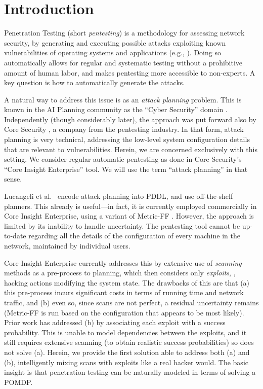 \section{Introduction}
\label{introduction}


Penetration Testing (short {\em pentesting}) is a methodology for
assessing network security, by generating and executing possible
attacks exploiting known vulnerabilities of operating systems and
applications (e.g., \cite{ArcGra04}). Doing so automatically allows
for regular and systematic testing without a prohibitive amount of
human labor, and makes pentesting more accessible to non-experts. A
key question is how to automatically generate the attacks.


A natural way to address this issue is as an {\em attack planning}
problem. This is known in the AI Planning community as the ``Cyber
Security'' domain \cite{BodGohHaiHar05}. Independently (though
considerably later), the approach was put forward also by Core
Security \cite{LucSarRic10}, a company from the
pentesting industry. In that form, attack planning is very technical,
addressing the low-level system configuration details that are
relevant to vulnerabilities. %
Herein, we are concerned exclusively with this setting. We consider
regular automatic pentesting as done in Core Security's ``Core Insight
Enterprise'' tool. We will use the term ``attack planning'' in that
sense.

Lucangeli et al.\  encode attack planning into
PDDL, and use off-the-shelf planners. This already is useful---in
fact, it is currently employed commercially in Core Insight
Enterprise, using a variant of Metric-FF
\cite{hoffmann:jair-03}. However, the approach is limited by its
inability to handle uncertainty. The pentesting tool cannot be
up-to-date regarding all the details of the configuration of every
machine in the network, maintained by individual users.

Core Insight Enterprise currently addresses this by extensive use of
{\em scanning} methods as a pre-process to planning, which then
considers only {\em exploits}, \ie, hacking actions modifying the
system state. The drawbacks of this are that (a) this pre-process
incurs significant costs in terms of running time and network traffic,
and (b) even so, since scans are not perfect, a residual uncertainty
remains (Metric-FF is run based on the configuration that appears to
be most likely). Prior work \cite{SarRicLuc11} has addressed (b) by
associating each exploit with a success probability. This is unable to
model dependencies between the exploits, %
and it still requires extensive scanning (to obtain realistic success
probabilities) so does not solve (a). Herein, we provide the first
solution able to address both (a) and (b), intelligently mixing scans
with exploits like a real hacker would. The basic insight is that
penetration testing can be naturally modeled in terms of solving a
POMDP.


